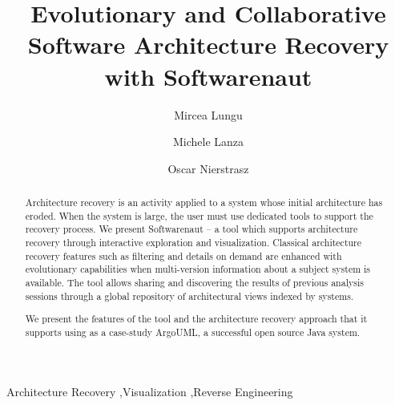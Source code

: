 \documentclass[preprint,12pt]{elsarticle}
\newcommand{\ugh}[1]{\textcolor{red}{\uwave{#1}}} %
\newcommand{\ugh}[1]{#1} %
\renewcommand{\ugh}[1]{#1} %
\newcommand\on[1]{\nbc{ON}{#1}{red}} %
\begin{document}
\begin{frontmatter}


\title{Evolutionary and Collaborative Software Architecture Recovery with Softwarenaut}

\author{Mircea Lungu}
\address{Software Composition Group - University of Bern, Switzerland}

\author{Michele Lanza}
\address{REVEAL @ Faculty of Informatics - University of Lugano, Switzerland}

\author{Oscar Nierstrasz}
\address{Software Composition Group - University of Bern, Switzerland}


\begin{abstract}

Architecture recovery is an activity applied to a system whose initial architecture has eroded. 
When the system is large, the user must use dedicated tools to support the recovery process. 
We present Softwarenaut -- a tool which supports architecture recovery through interactive exploration and visualization.
Classical architecture recovery features such as filtering and details on demand are enhanced with 
evolutionary capabilities when multi-version information about a subject system is available. The tool allows sharing and discovering the results of previous analysis sessions through a global repository of architectural views indexed by systems. 

We present the features of the tool and the architecture recovery approach that it supports using as a case-study ArgoUML, a successful open source Java system.


\end{abstract}

\begin{keyword}
Architecture Recovery \sep Visualization \sep Reverse Engineering
\end{keyword}

\end{frontmatter}
\end{document}
